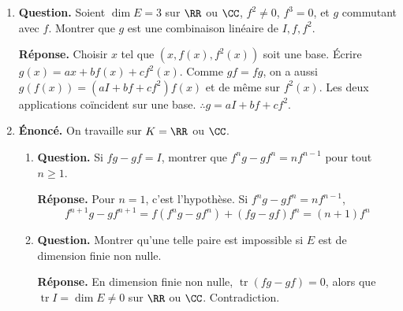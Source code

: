 \documentclass[12pt, a4paper]{article}
\begin{document}
\begin{enumerate}[label=7.\arabic*., start=68]
\begin{minipage}[t]{\linewidth}
\begin{enumerate}[\arabic*.]
  \item \textbf{Question.} Si $f^2\neq0$ et $f^3=0$, montrer qu’il existe une base où $[f]=\begin{pmatrix}0&0&0\\1&0&0\\0&1&0\end{pmatrix}$.
\par\smallskip
\textbf{Réponse.} Choisir $x$ avec $f^2(x)\neq0$.
        D'après 7.71, $(x,f(x),f^2(x))$ est une base.
        La matrice est $\begin{pmatrix}0&0&0\\1&0&0\\0&1&0\end{pmatrix}$.

\end{enumerate}
\end{minipage}

  \item \begin{minipage}[t]{\linewidth}\raggedright
\textbf{Question.} Soient $\dim E=3$ sur $\RR$ ou $\CC$, $f^2\neq0$, $f^3=0$, et $g$ commutant avec $f$. Montrer que $g$ est une combinaison linéaire de $I,f,f^2$.
\par\smallskip
\textbf{Réponse.} Choisir $x$ tel que $(x,f(x),f^2(x))$ soit une base.
    Écrire $g(x)=ax+bf(x)+cf^2(x)$.
    Comme $gf=fg$, on a aussi $g(f(x))=(aI+bf+cf^2)f(x)$ et de même sur $f^2(x)$.
    Les deux applications coïncident sur une base.
    $\therefore g=aI+bf+cf^2$.
\end{minipage}

  \item \begin{minipage}[t]{\linewidth}\raggedright
\textbf{Énoncé.} On travaille sur $K=\RR$ ou $\CC$.

\begin{enumerate}[\arabic*.]
        \item \textbf{Question.} Si $fg-gf=I$, montrer que $f^ng-gf^n=nf^{n-1}$ pour tout $n\geq1$.
\par\smallskip
\textbf{Réponse.} Pour $n=1$, c'est l'hypothèse. Si $f^ng-gf^n=nf^{n-1}$,
        \[
          f^{n+1}g-gf^{n+1}=f(f^ng-gf^n)+(fg-gf)f^n=(n+1)f^n
        \]

  \item \textbf{Question.} Montrer qu’une telle paire est impossible si $E$ est de dimension finie non nulle.
\par\smallskip
\textbf{Réponse.} En dimension finie non nulle, $\operatorname{tr}(fg-gf)=0$, alors que $\operatorname{tr}I=\dim E\neq0$ sur $\RR$ ou $\CC$.
        Contradiction.


\end{enumerate}
\end{minipage}
\end{enumerate}
\end{document}
